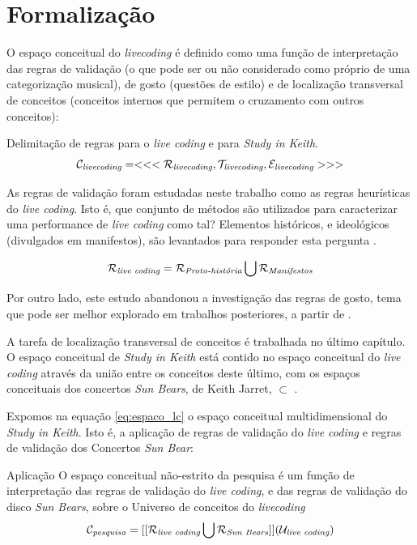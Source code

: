 \section{Formalização}\label{sec:formaliza}

O espaço conceitual do \emph{livecoding} é definido como uma função de interpretação das regras de validação (o que pode ser ou não considerado como próprio de uma categorização musical), de gosto (questões de estilo) e de localização transversal de conceitos (conceitos internos que permitem o cruzamento com outros conceitos):

\begin{example}{Delimitação de regras para o \emph{live coding} e para \emph{Study in Keith}.}
\begin{equation}
\mathcal{C}_\emph{livecoding} = <<<\mathcal{R}_\emph{livecoding}, \mathcal{T}_\emph{livecoding},  \mathcal{E}_\emph{livecoding} >>> 
\end{equation}

As regras de validação foram estudadas neste trabalho como as regras heurísticas do \emph{live coding}. Isto é, que conjunto de métodos são utilizados para caracterizar uma performance de \emph{live coding} como tal? Elementos históricos, e ideológicos (divulgados em manifestos), são levantados para responder esta pergunta .

\begin{equation}
\mathcal{R}_\emph{live coding} = \mathcal{R}_\emph{Proto-história} \bigcup  \mathcal{R}_\emph{Manifestos}
\end{equation}

Por outro lado, este estudo abandonou a investigação das regras de gosto, tema que pode ser melhor explorado em trabalhos posteriores, a partir de .

A tarefa de localização transversal de conceitos é trabalhada no último capítulo. O espaço conceitual de \emph{Study in Keith} está contido no espaço conceitual do \emph{live coding} através da união entre os conceitos deste último, com os espaços conceituais dos concertos \emph{Sun Bears}, de Keith Jarret,  $\subset$ . 

\end{example}

Expomos na equação \ref{eq:espaco_lc} o espaço conceitual multidimensional do \emph{Study in Keith}. Isto é, a aplicação de regras de validação do \emph{live coding} e regras de validação dos Concertos \emph{Sun Bear}:

\begin{example}{Aplicação}\label{eq:espaco_lc}
O espaço conceitual não-estrito da pesquisa é um função de interpretação das regras de validação do \emph{live coding}, e das regras de validação do disco \emph{Sun Bears}, sobre o Universo de conceitos do \emph{livecoding}
\begin{equation}
\mathcal{C}_\emph{pesquisa} = [[\mathcal{R}_\emph{live coding} \bigcup \mathcal{R}_\emph{Sun Bears}]](\mathcal{U}_\emph{live coding} )
\end{equation}
\end{example}